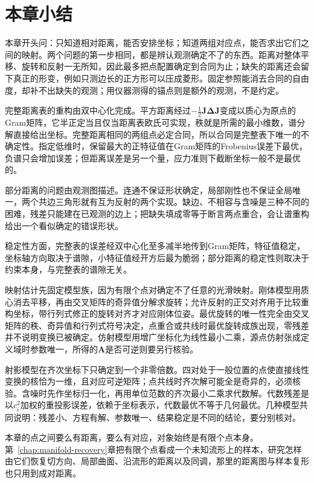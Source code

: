 \section{本章小结}
\label{sec:smap-summary}

本章开头问：只知道相对距离，能否安排坐标；知道两组对应点，能否求出它们之间的映射。两个问题的第一步相同，都是辨认观测确定不了的东西。距离对整体平移、旋转和反射一无所知，因此最多把点配置确定到合同为止；缺失的距离还会留下真正的形变，例如只测边长的正方形可以压成菱形。固定参照能消去合同的自由度，却补不出缺失的观测；用仪器测得的锚点则是额外的观测，不是约定。

完整距离表的重构由双中心化完成。平方距离经过$-\frac12\bm J\bm\Delta\bm J$变成以质心为原点的Gram矩阵，它半正定当且仅当距离表欧氏可实现，秩就是所需的最小维数，谱分解直接给出坐标。完整距离相同的两组点必定合同，所以合同是完整表下唯一的不确定性。指定低维时，保留最大的正特征值在Gram矩阵的Frobenius误差下最优，负谱只会增加误差；但距离误差是另一个量，应力准则下截断坐标一般不是最优的。

部分距离的问题由观测图描述。连通不保证形状确定，局部刚性也不保证全局唯一，两个共边三角形就有互为反射的两个实现。缺边、不相容与含噪是三种不同的困难，残差只能建在已观测的边上；把缺失填成零等于断言两点重合，会让谱重构给出一个看似确定的错误形状。

稳定性方面，完整表的误差经双中心化至多减半地传到Gram矩阵，特征值稳定，坐标轴方向取决于谱隙，小特征值经开方后最为脆弱；部分距离的稳定性则取决于约束本身，与完整表的谱隙无关。

映射估计先固定模型族，因为有限个点对确定不了任意的光滑映射。刚体模型用质心消去平移，再由交叉矩阵的奇异值分解求旋转；允许反射的正交对齐用于比较重构坐标，带行列式修正的旋转对齐才对应刚体位姿。最优旋转的唯一性完全由交叉矩阵的秩、奇异值和行列式符号决定，点重合或共线时最优旋转成族出现，零残差并不说明变换已被确定。仿射模型用增广坐标化为线性最小二乘，源点仿射张成定义域时参数唯一，所得的$\bm A$是否可逆则要另行核验。

射影模型在齐次坐标下只确定到一个非零倍数。四对处于一般位置的点使直接线性变换的核恰为一维，且对应可逆矩阵；点共线时齐次解可能全是奇异的，必须核验。含噪时先作坐标归一化，再用单位范数的齐次最小二乘求代数解。代数残差是以$c_i^2$加权的重投影误差，依赖于坐标表示，代数最优不等于几何最优。几种模型共同说明：残差小、方程有解、参数唯一、结果稳定是不同的结论，要分别核对。

本章的点之间要么有距离，要么有对应，对象始终是有限个点本身。第~\ref{chap:manifold-recovery}章把有限个点看成一个未知流形上的样本，研究怎样由它们恢复切方向、局部曲面、沿流形的距离以及同调，那里的距离图与样本复形也只用到成对距离。
